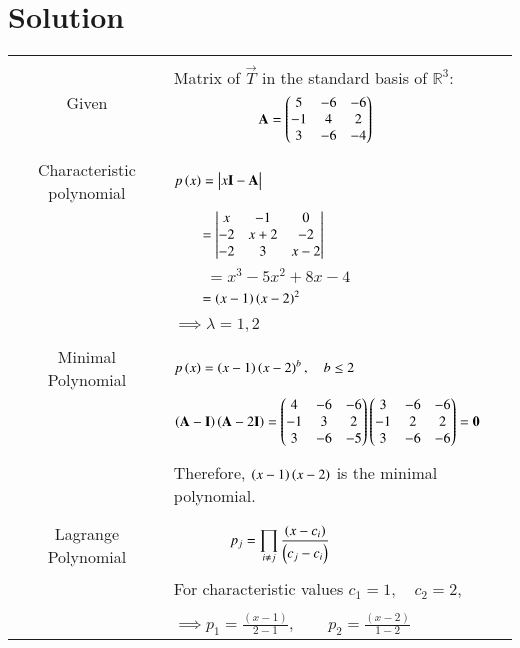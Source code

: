 \documentclass[journal,12pt]{IEEEtran}
\begin{document}
\section{\textbf{Solution}}
\renewcommand{\thetable}{2}
\begin{longtable}{|c|l|}
    \hline
    \multirow{3}{*}{Given} 
	& \\
	&Matrix of $\vec{T}$ in the standard basis of $\mathbb{R}^3:$\\
	& $\qquad\qquad\qquad\mathbf{A}=\begin{pmatrix}5&-6&-6\\-1&4&2\\3&-6&-4\end{pmatrix}$\\
	&\\
	\hline
	\multirow{3}{*}{Characteristic polynomial} 
	& \\
	& $p\brak{x}=\mydet{x\Vec{I}-\Vec{A}}$\\
	&\\
	& $\qquad = \begin{vmatrix}x&-1&0\\-2&x+2&-2\\-2&3&x-2\end{vmatrix}$\\
	& $\qquad=x^3-5x^2+8x-4$\\
	&$\qquad=\left(x-1\right)\left(x-2\right)^2$\\
	&\\
	&$\implies \lambda=1, 2$\\
	&\\
	\hline
	\multirow{3}{*}{Minimal Polynomial} & \\
	& $p\left(x\right)=\left(x-1\right)\left(x-2\right)^b,\quad b\leq2$\\
	&\\
	&$\left(\mathbf{A}-\mathbf{I}\right)\left(\mathbf{A}-2\mathbf{I}\right)=\begin{pmatrix}4&-6&-6\\-1&3&2\\3&-6&-5\end{pmatrix}\begin{pmatrix}3&-6&-6\\-1&2&2\\3&-6&-6\end{pmatrix}=\mathbf{0}$\\
	&\\
	&Therefore, $\left(x-1\right)\left(x-2\right)$ is the minimal polynomial.\\
	&\\
	\hline
	\multirow{3}{*}{Lagrange Polynomial} 
	& \\
	& $\qquad\qquad p_j=\displaystyle\prod_{i\neq j} \frac{\left(x-c_i\right)}{\left(c_j-c_i\right)}$\\
	&\\
	& For characteristic values $c_1=1,\quad c_2=2$,\\
	&\\
	& $\implies p_1=\frac{(x-1)}{2-1}, \qquad p_2=\frac{(x-2)}{1-2}$\\

\end{longtable}
\end{document}
